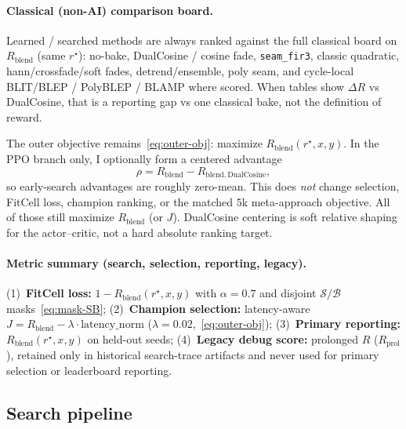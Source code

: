 \paragraph{Classical (non-AI) comparison board.}
\label{sec:classical-board}
Learned / searched methods are always ranked against the full classical board on $R_{\mathrm{blend}}$ (same $r^{\star}$):
no-bake, DualCosine / cosine fade, \texttt{seam\_fir3}, classic quadratic, hann/crossfade/soft fades, detrend/ensemble, poly seam, and cycle-local BLIT/BLEP / PolyBLEP / BLAMP where scored.
When tables show $\Delta R$ vs DualCosine, that is a reporting gap vs one classical bake, not the definition of reward.

\begin{remark}
\label{rem:dualcosine-centering}
The outer objective remains~\eqref{eq:outer-obj}: maximize $R_{\mathrm{blend}}(r^{\star},x,y)$.
In the PPO branch only, I optionally form a centered advantage
\begin{equation}
\label{eq:dualcosine-centering}
\rho = R_{\mathrm{blend}} - R_{\mathrm{blend},\mathrm{DualCosine}},
\end{equation}
so early-search advantages are roughly zero-mean.
This does \emph{not} change selection, FitCell loss, champion ranking, or the matched $5$k meta-approach objective.
All of those still maximize $R_{\mathrm{blend}}$ (or $J$).
DualCosine centering is soft relative shaping for the actor--critic, not a hard absolute ranking target.
\end{remark}

\paragraph{Metric summary (search, selection, reporting, legacy).}
(1)~\textbf{FitCell loss:} $1 - R_{\mathrm{blend}}(r^{\star},x,y)$ with $\alpha{=}0.7$ and disjoint $\mathcal{S}/\mathcal{B}$ masks~\eqref{eq:mask-SB};
(2)~\textbf{Champion selection:} latency-aware $J = R_{\mathrm{blend}} - \lambda\cdot\mathrm{latency\_norm}$ ($\lambda{=}0.02$,~\eqref{eq:outer-obj});
(3)~\textbf{Primary reporting:} $R_{\mathrm{blend}}(r^{\star},x,y)$ on held-out seeds;
(4)~\textbf{Legacy debug score:} prolonged $R$ ($R_{\mathrm{prol}}$), retained only in historical search-trace artifacts and never used for primary selection or leaderboard reporting.

\subsection{Search pipeline}
\label{sec:pipeline-overview}

